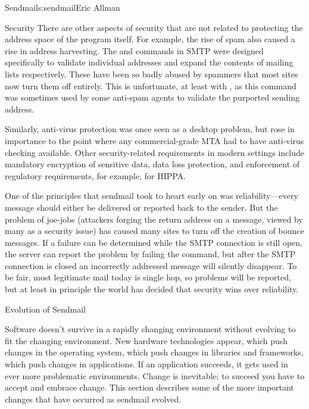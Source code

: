 \begin{aosachapter}{Sendmail}{s:sendmail}{Eric Allman}
\begin{aosasect1}{Security}
There are other aspects of security that are not related to protecting
the address space of the program itself. For example, the rise of spam
also caused a rise in address harvesting. The  and  commands
in SMTP were designed specifically to validate individual addresses
and expand the contents of mailing lists respectively. These have been
so badly abused by spammers that most sites now turn them off
entirely. This is unfortunate, at least with , as this command was
sometimes used by some anti-spam agents to validate the purported
sending address.

Similarly, anti-virus protection was once seen as a desktop problem,
but rose in importance to the point where any commercial-grade MTA had
to have anti-virus checking available.
Other security-related requirements in modern settings
include mandatory encryption of sensitive data,
data loss protection,
and enforcement of regulatory requirements,
for example, for HIPPA.

One of the principles that sendmail took to heart early on was
reliability---every message should either be delivered or reported
back to the sender. But the problem of joe-jobs (attackers forging
the return address on a message, viewed by many as a security issue)
has caused many sites to turn off the
creation of bounce messages. If a failure can be determined while
the SMTP connection is still open, the server can report the problem
by failing the command, but after the SMTP connection is closed an
incorrectly addressed message will silently disappear. To be fair,
most legitimate mail today is single hop, so problems will be
reported, but at least in principle the world has decided that
security wins over reliability.

\end{aosasect1}

\begin{aosasect1}{Evolution of Sendmail}
\label{sec.sendmail.evo}

Software doesn't survive in a rapidly changing environment without
evolving to fit the changing environment. New hardware technologies
appear, which push changes in the operating system, which push changes
in libraries and frameworks, which push changes in applications. If an
application succeeds, it gets used in ever more problematic
environments.  Change is inevitable; to succeed you have to accept and
embrace change.  This section describes some of the more important
changes that have occurred as sendmail evolved.


\end{aosasect1}
\end{aosachapter}
